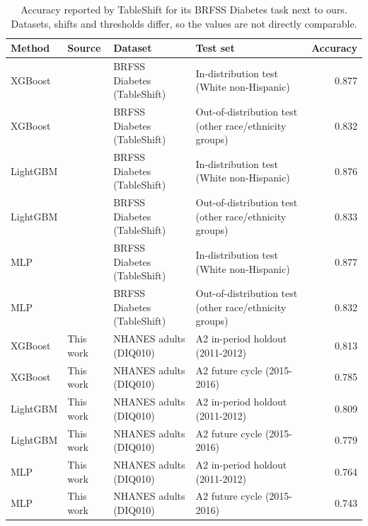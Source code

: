 \begin{table}[t]
\centering
\footnotesize
\caption{Accuracy reported by TableShift for its BRFSS Diabetes task next to ours. Datasets, shifts and thresholds differ, so the values are not directly comparable.}
\label{tab:literature}
\begin{tabular}{llllr}
\toprule
Method & Source & Dataset & Test set & Accuracy \\
\midrule
XGBoost & \cite{gardner2023tableshift} & BRFSS Diabetes (TableShift) & In-distribution test (White non-Hispanic) & 0.877 \\
XGBoost & \cite{gardner2023tableshift} & BRFSS Diabetes (TableShift) & Out-of-distribution test (other race/ethnicity groups) & 0.832 \\
LightGBM & \cite{gardner2023tableshift} & BRFSS Diabetes (TableShift) & In-distribution test (White non-Hispanic) & 0.876 \\
LightGBM & \cite{gardner2023tableshift} & BRFSS Diabetes (TableShift) & Out-of-distribution test (other race/ethnicity groups) & 0.833 \\
MLP & \cite{gardner2023tableshift} & BRFSS Diabetes (TableShift) & In-distribution test (White non-Hispanic) & 0.877 \\
MLP & \cite{gardner2023tableshift} & BRFSS Diabetes (TableShift) & Out-of-distribution test (other race/ethnicity groups) & 0.832 \\
XGBoost & This work & NHANES adults (DIQ010) & A2 in-period holdout (2011-2012) & 0.813 \\
XGBoost & This work & NHANES adults (DIQ010) & A2 future cycle (2015-2016) & 0.785 \\
LightGBM & This work & NHANES adults (DIQ010) & A2 in-period holdout (2011-2012) & 0.809 \\
LightGBM & This work & NHANES adults (DIQ010) & A2 future cycle (2015-2016) & 0.779 \\
MLP & This work & NHANES adults (DIQ010) & A2 in-period holdout (2011-2012) & 0.764 \\
MLP & This work & NHANES adults (DIQ010) & A2 future cycle (2015-2016) & 0.743 \\
\bottomrule
\end{tabular}
\end{table}
